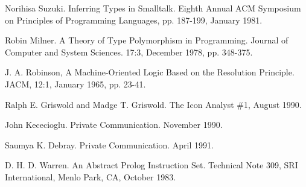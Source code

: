 \begin{noIndex}
 Norihisa Suzuki. Inferring Types in Smalltalk. Eighth
Annual ACM Symposium on Principles of Programming Languages,
pp. 187-199, January 1981.

\noindent
[Milner] Robin Milner. A Theory of Type Polymorphism in
Programming. Journal of Computer and System Sciences. 17:3, December
1978, pp. 348-375.

\noindent
[unify] J. A. Robinson, A Machine-Oriented Logic Based on the
Resolution Principle. JACM, 12:1, January 1965, pp.  23-41.

\noindent
[ianl1] Ralph E. Griswold and Madge T. Griswold. The Icon Analyst \#1,
August 1990.

\noindent
[johnk] John Kececioglu. Private Communication. November 1990.

 Saumya K. Debray. Private Communication. April 1991.

\noindent
[wam] D. H. D. Warren. An Abstract Prolog Instruction Set. Technical
Note 309, SRI International, Menlo Park, CA, October 1983.
\end{noIndex}
